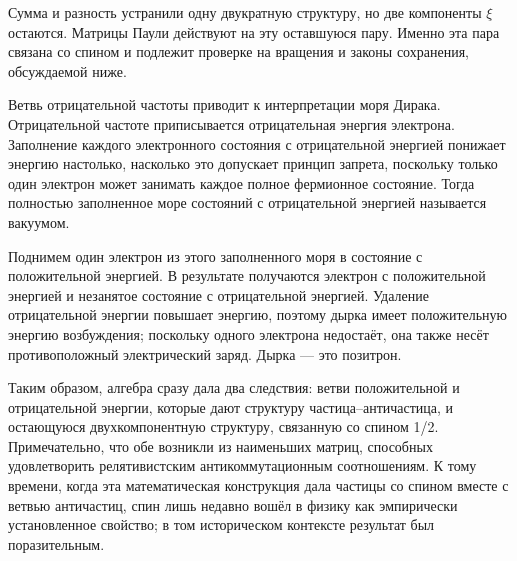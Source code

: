 Сумма и разность устранили одну двукратную структуру, но две компоненты \(\xi\) остаются. Матрицы Паули действуют на эту оставшуюся пару. Именно эта пара связана со спином и подлежит проверке на вращения и законы сохранения, обсуждаемой ниже.

\begin{classroomqa}
\end{classroomqa}

Ветвь отрицательной частоты приводит к интерпретации моря Дирака. Отрицательной частоте приписывается отрицательная энергия электрона. Заполнение каждого электронного состояния с отрицательной энергией понижает энергию настолько, насколько это допускает принцип запрета, поскольку только один электрон может занимать каждое полное фермионное состояние. Тогда полностью заполненное море состояний с отрицательной энергией называется вакуумом.

Поднимем один электрон из этого заполненного моря в состояние с положительной энергией. В результате получаются электрон с положительной энергией и незанятое состояние с отрицательной энергией. Удаление отрицательной энергии повышает энергию, поэтому дырка имеет положительную энергию возбуждения; поскольку одного электрона недостаёт, она также несёт противоположный электрический заряд. Дырка — это позитрон.

\begin{classroomqa}
\end{classroomqa}

Таким образом, алгебра сразу дала два следствия: ветви положительной и отрицательной энергии, которые дают структуру частица--античастица, и остающуюся двухкомпонентную структуру, связанную со спином 1/2. Примечательно, что обе возникли из наименьших матриц, способных удовлетворить релятивистским антикоммутационным соотношениям. К тому времени, когда эта математическая конструкция дала частицы со спином вместе с ветвью античастиц, спин лишь недавно вошёл в физику как эмпирически установленное свойство; в том историческом контексте результат был поразительным.

